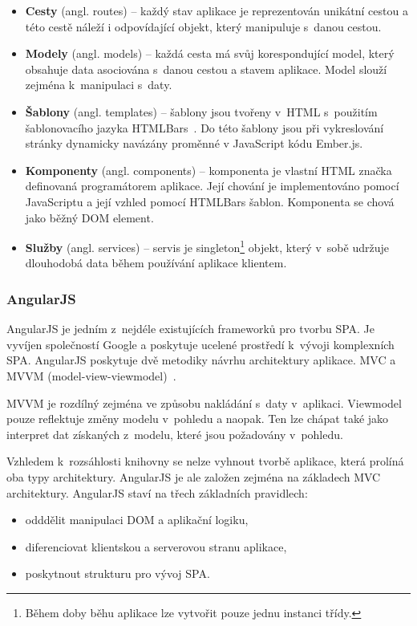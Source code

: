\begin{itemize}  
    \item {\bf Cesty} (angl. routes) -- každý stav aplikace je reprezentován unikátní cestou a této cestě náleží i odpovídající objekt, který manipuluje s~danou cestou.
    \item {\bf Modely} (angl. models) -- každá cesta má svůj korespondující model, který obsahuje data asociována s~danou cestou a stavem aplikace. Model slouží zejména k~manipulaci s~daty.
    \item {\bf Šablony} (angl. templates) -- šablony jsou tvořeny v~HTML s~použitím šablonovacího jazyka HTMLBars~\cite{htmlbars}. Do této šablony jsou při vykreslování stránky dynamicky navázány proměnné v JavaScript kódu Ember.js. 
    \item {\bf Komponenty} (angl. components) -- komponenta je vlastní HTML značka definovaná programátorem aplikace. Její chování je implementováno pomocí JavaScriptu a její vzhled pomocí HTMLBars šablon. Komponenta se chová jako běžný DOM element.
    \item {\bf Služby} (angl. services) -- servis je singleton\footnote{Během doby běhu aplikace lze vytvořit pouze jednu instanci třídy.} objekt, který v~sobě udržuje dlouhodobá data během používání aplikace klientem.
\end{itemize}

\subsubsection*{AngularJS}

AngularJS je jedním z~nejdéle existujících frameworků pro tvorbu SPA. Je vyvíjen společností Google a poskytuje ucelené prostředí k~vývoji komplexních SPA. AngularJS poskytuje dvě metodiky návrhu architektury aplikace. MVC a MVVM (model-view-viewmodel)~\cite{mvvm}.

MVVM je rozdílný zejména ve způsobu nakládání s~daty v~aplikaci. Viewmodel pouze reflektuje změny modelu v~pohledu a naopak. Ten lze chápat také jako interpret dat získaných z~modelu, které jsou požadovány v~pohledu.

Vzhledem k~rozsáhlosti knihovny se nelze vyhnout tvorbě aplikace, která prolíná oba typy architektury. AngularJS je ale založen zejména na základech MVC architektury. AngularJS staví na třech základních pravidlech:

\begin{itemize}
    \item odddělit manipulaci DOM a aplikační logiku,
    \item diferenciovat klientskou a serverovou stranu aplikace,
    \item poskytnout strukturu pro vývoj SPA.
\end{itemize}

